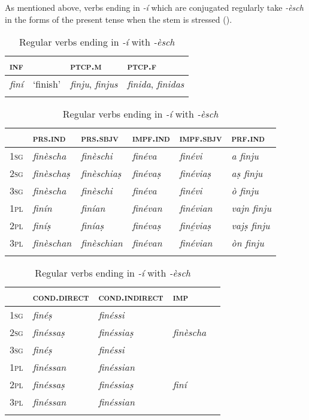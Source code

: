 As mentioned above, verbs ending in \textit{-í} which are conjugated regularly  take \textit{-èsch} in the forms of the present tense when the stem is stressed ().


\begin{table}
	\caption{Regular verbs ending in \textit{-í} with  \textit{-èsch}}
	\label{tab:reg.verb-i}
	\begin{tabularx}{.7\textwidth}{llll}
		
		\lsptoprule
		\textsc{inf} & & \textsc{ptcp.m}  & \textsc{ptcp.f}  \\
		\midrule
		\textit{finí} & `finish' & \textit{finju}, \textit{finjus} & \textit{finida}, \textit{finidas} \\
		\lspbottomrule  
	\end{tabularx}
	
	\medskip
	
	\begin{tabularx}{\textwidth}{p{}lllll}
		\lsptoprule
		&\textsc{prs.ind} &\textsc{prs.sbjv} &\textsc{impf.ind} & \textsc{impf.sbjv} &\textsc{prf.ind}\\
		\midrule
		\textsc{1sg} & \textit{finèscha} & \textit{finèschi} & \textit{finéva} & \textit{finévi} & \textit{a finju} \\
		\textsc{2sg} & \textit{finèschaṣ} & \textit{finèschiaṣ} & \textit{finévaṣ} & \textit{finéviaṣ} & \textit{aṣ finju}\\
		\textsc{3sg} & \textit{finèscha}  & \textit{finèschi} & \textit{finéva} & \textit{finévi} & \textit{ò finju}\\
		\textsc{1pl} & \textit{finín} & \textit{finían} & \textit{finévan} & \textit{finévian} &\textit{vajn finju}\\
		\textsc{2pl} & \textit{finíṣ} & \textit{finíaṣ} & \textit{finévaṣ} & \textit{finé̱viaṣ} & \textit{vajṣ finju} \\
		\textsc{3pl} & \textit{finèschan}  & \textit{finèschian} & \textit{finévan} & \textit{finévian} & \textit{òn finju}\\
		\lspbottomrule
	\end{tabularx}
	
	\medskip
	
	\begin{tabularx} {\textwidth}{p{2cm}XXXX}
		\lsptoprule
		&\textsc{cond.direct} &  \textsc{cond.indirect} &\textsc{imp}\\
		\midrule
		\textsc{1sg} & \textit{finéṣ} & \textit{finéssi} \\
		\textsc{2sg} & \textit{finéssaṣ} &\textit{finéssiaṣ}  &  \textit{finèscha}\\
		\textsc{3sg} & \textit{finéṣ}  & \textit{finéssi}\\
		\textsc{1pl} & \textit{finéssan} &  \textit{finéssian}\\
		\textsc{2pl} &  \textit{finéssaṣ} & \textit{finéssiaṣ} & \textit{finí}\\
		\textsc{3pl} & \textit{finéssan} & \textit{finéssian}\\
		\lspbottomrule
	\end{tabularx} 
\end{table}


